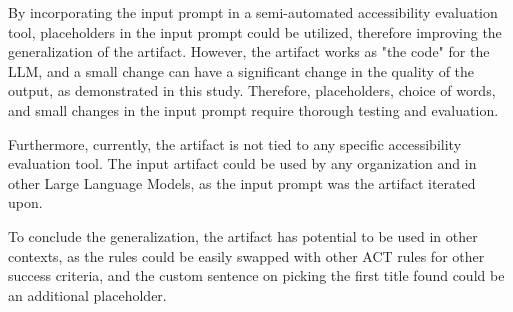 By incorporating the input prompt in a semi-automated accessibility evaluation tool, placeholders in the input prompt could be utilized, therefore improving the generalization of the artifact. However, the artifact works as "the code" for the LLM, and a small change can have a significant change in the quality of the output, as demonstrated in this study. Therefore, placeholders, choice of words, and small changes in the input prompt require thorough testing and evaluation.

Furthermore, currently, the artifact is not tied to any specific accessibility evaluation tool. The input artifact could be used by any organization and in other Large Language Models, as the input prompt was the artifact iterated upon.

To conclude the generalization, the artifact has potential to be used in other contexts, as the rules could be easily swapped with other ACT rules for other success criteria, and the custom sentence on picking the first title found could be an additional placeholder.
